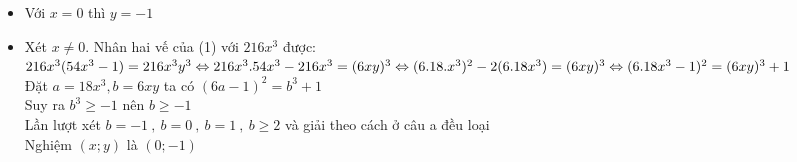 \begin{bt}
{\begin{enumerate}
            \begin{itemize}
                \item Với $x=0$ thì $y=-1$
                \item Xét $x\ne 0$. Nhân hai vế của (1) với $216x^3$ được:\\
                $216x^3(54x^3-1)=216x^3y^3 \Leftrightarrow 216x^3.54x^3-216x^3=(6xy)^3\\
                \Leftrightarrow (6.18.x^3)^2-2(6.18x^3)=(6xy)^3\\
                \Leftrightarrow (6.18x^3-1)^2=(6xy)^3+1$\\
                Đặt $a=18x^3,b=6xy$ ta có $(6a-1)^2=b^3+1$\\
                Suy ra $b^3 \geq -1$ nên $b \geq -1$\\
                Lần lượt xét $b=-1\ ,\ b=0\ ,\ b=1\ ,\ b \geq 2$ và giải theo cách ở câu a đều loại\\
                Nghiệm $(x;y)$ là $(0;-1)$
            \end{itemize}
\end{enumerate}    
    }
\end{bt}
   